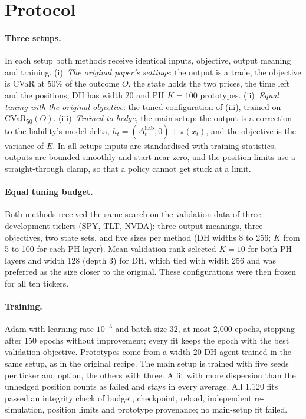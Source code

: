\documentclass[runningheads]{llncs}
\begin{document}
\section{Protocol}
\label{sec:protocol}

\paragraph{Three setups.} In each setup both methods receive identical inputs, objective, output meaning
and training. (i)~\emph{The original paper's settings}: the output is a trade, the objective is CVaR at 50\%
of the outcome $O$, the state holds the two prices, the time left and the positions, DH has width 20 and PH
$K=100$ prototypes. (ii)~\emph{Equal tuning with the original objective}: the tuned configuration of (iii),
trained on CVaR$_{50}(O)$. (iii)~\emph{Trained to hedge}, the main setup: the output is a correction to the
liability's model delta, $h_t=(\Delta^{\mathrm{liab}}_t,0)+\pi(x_t)$, and the objective is the variance of
$E$. In all setups inputs are standardised with training statistics, outputs are bounded smoothly and start
near zero, and the position limits use a straight-through clamp, so that a policy cannot get stuck at a
limit.

\paragraph{Equal tuning budget.} Both methods received the same search on the validation data of three
development tickers (SPY, TLT, NVDA): three output meanings, three objectives, two state sets, and five sizes
per method (DH widths 8 to 256; $K$ from 5 to 100 for each PH layer). Mean validation rank selected $K=10$
for both PH layers and width 128 (depth 3) for DH, which tied with width 256 and was preferred as the size
closer to the original. These configurations were then frozen for all ten tickers.

\paragraph{Training.} Adam with learning rate $10^{-3}$ and batch size 32, at most 2,000 epochs, stopping
after 150 epochs without improvement; every fit keeps the epoch with the best validation objective.
Prototypes come from a width-20 DH agent trained in the same setup, as in the original recipe. The main setup
is trained with five seeds per ticker and option, the others with three. A fit with more dispersion than the
unhedged position counts as failed and stays in every average. All 1,120 fits passed an integrity check of
budget, checkpoint, reload, independent re-simulation, position limits and prototype provenance; no
main-setup fit failed.
\end{document}
